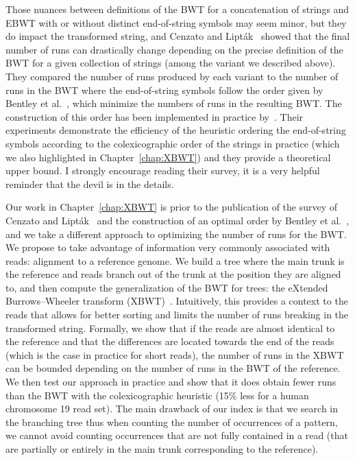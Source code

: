 Those nuances between definitions of the BWT for a concatenation of strings and EBWT with or without distinct end-of-string symbols may seem minor, but they do impact the transformed string, and 
Cenzato and Lipták~\cite{cenzato_et_al_BWT_Collections} showed that the final number of runs can drastically change depending on the precise definition of the BWT for a given collection of strings (among the variant we described above). 
They compared the number of runs produced by each variant to the number of runs in the BWT where the end-of-string symbols follow the order given by Bentley et al.~\cite{bentley2019complexity}, which minimize the numbers of runs in the resulting BWT. The construction of this order has been implemented in practice by~\cite{cenzato2023computing}.
Their experiments demonstrate the efficiency of the heuristic ordering the end-of-string symbols according to the colexicographic order of the strings in practice (which we also highlighted in Chapter~\ref{chap:XBWT}) and they provide a theoretical upper bound. I strongly encourage reading their survey, it is a very helpful reminder that the devil is in the details.

Our work in Chapter~\ref{chap:XBWT} is prior to the publication of the survey of Cenzato and Lipták~\cite{cenzato_et_al_BWT_Collections} and the construction of an optimal order by Bentley et al.~\cite{bentley2019complexity}, and we take a different approach to optimizing the number of runs for the BWT. We propose to take advantage of information very commonly associated with reads: alignment to a reference genome. We build a tree where the main trunk is the reference and reads branch out of the trunk at the position they are aligned to, and then compute the generalization of the BWT for trees: the eXtended Burrows--Wheeler transform (XBWT)~\cite{ferragina2009compressing}. Intuitively, this provides a context to the reads that allows for better sorting and limits the number of runs breaking in the transformed string. Formally, we show that if the reads are almost identical to the reference and that the differences are located towards the end of the reads (which is the case in practice for short reads), the number of runs in the XBWT can be bounded depending on the number of runs in the BWT of the reference. We then test our approach in practice and show that it does obtain fewer runs than the BWT with the colexicographic heuristic (15\% less for a human chromosome 19 read set).
The main drawback of our index is that we search in the branching tree thus when counting the number of occurrences of a pattern, we cannot avoid counting occurrences that are not fully contained in a read (that are partially or entirely in the main trunk corresponding to the reference).

